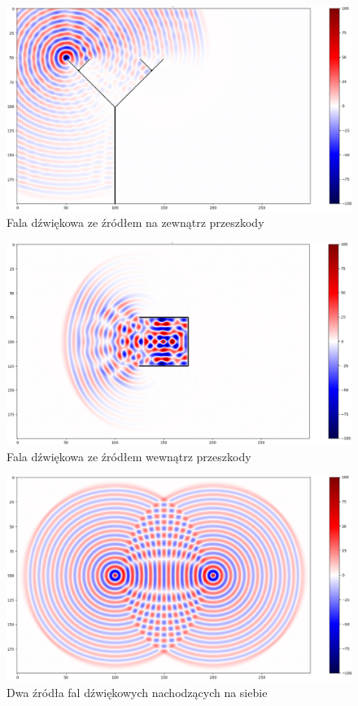 \documentclass[a4paper, 12pt]{article}
\begin{document}
\begin{figure}
\includegraphics[scale=0.43]{no2.png}
\caption{Fala dźwiękowa ze źródłem na zewnątrz przeszkody}
\end{figure}

\begin{figure}
\includegraphics[scale=0.43]{no3.png}
\caption{Fala dźwiękowa ze źródłem wewnątrz przeszkody}
\end{figure}

\begin{figure}
\includegraphics[scale=0.43]{no4.png}
\caption{Dwa źródła fal dźwiękowych nachodzących na siebie}
\end{figure}
\end{document}
